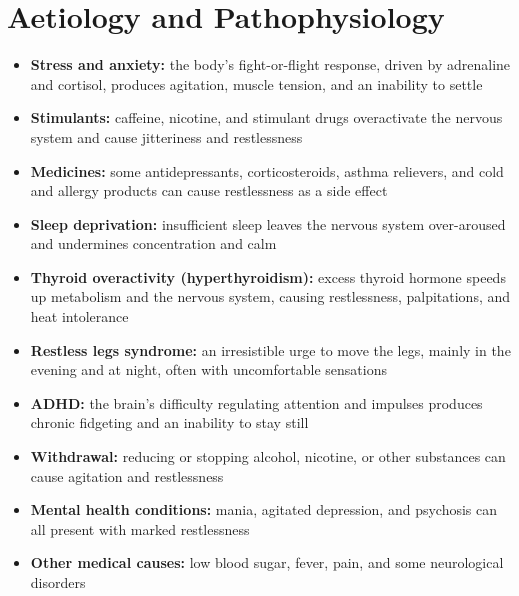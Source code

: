 \section*{Aetiology and Pathophysiology}
\begin{itemize}
    \item \textbf{Stress and anxiety:} the body's fight-or-flight response, driven by adrenaline and cortisol, produces agitation, muscle tension, and an inability to settle
    \item \textbf{Stimulants:} caffeine, nicotine, and stimulant drugs overactivate the nervous system and cause jitteriness and restlessness
    \item \textbf{Medicines:} some antidepressants, corticosteroids, asthma relievers, and cold and allergy products can cause restlessness as a side effect
    \item \textbf{Sleep deprivation:} insufficient sleep leaves the nervous system over-aroused and undermines concentration and calm
    \item \textbf{Thyroid overactivity (hyperthyroidism):} excess thyroid hormone speeds up metabolism and the nervous system, causing restlessness, palpitations, and heat intolerance
    \item \textbf{Restless legs syndrome:} an irresistible urge to move the legs, mainly in the evening and at night, often with uncomfortable sensations
    \item \textbf{ADHD:} the brain's difficulty regulating attention and impulses produces chronic fidgeting and an inability to stay still
    \item \textbf{Withdrawal:} reducing or stopping alcohol, nicotine, or other substances can cause agitation and restlessness
    \item \textbf{Mental health conditions:} mania, agitated depression, and psychosis can all present with marked restlessness
    \item \textbf{Other medical causes:} low blood sugar, fever, pain, and some neurological disorders
\end{itemize}

